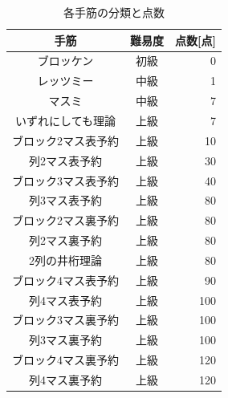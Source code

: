 \documentclass[submit,techrep,noauthor]{ipsj}
\begin{document}
	\begin{table}[tb]
		\caption{各手筋の分類と点数}
		\label{solution_point}
			\begin{tabular}{ccr}
			\hline\hline
			手筋 & 難易度 & 点数[点]\\
			\hline
ブロッケン & 初級 & 0\\ 
レッツミー & 中級 & 1\\
マスミ & 中級 & 7\\
いずれにしても理論 & 上級 & 7\\
ブロック2マス表予約 & 上級 & 10\\
列2マス表予約 & 上級 & 30\\
ブロック3マス表予約 & 上級 & 40\\
列3マス表予約 & 上級 & 80\\
ブロック2マス裏予約 & 上級 & 80\\
列2マス裏予約 & 上級 & 80\\
2列の井桁理論 & 上級 & 80\\
ブロック4マス表予約 & 上級 & 90\\
列4マス表予約 & 上級 & 100\\
ブロック3マス裏予約 & 上級 & 100\\
列3マス裏予約 & 上級 & 100\\
ブロック4マス裏予約 & 上級 & 120\\
列4マス裏予約 & 上級 & 120\\
			\hline
	 	\end{tabular}
	\end{table}
\end{document}
